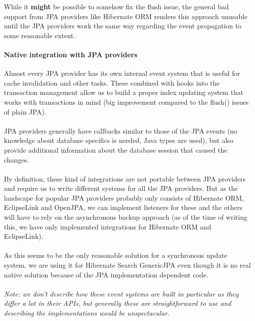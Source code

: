 \noindent
While it \textbf{might} be possible to somehow fix the flush issue, the general bad support from JPA providers like Hibernate ORM renders this approach unusable until the JPA providers work the same way regarding the event propagation to some reasonable extent.

\pagebreak

\paragraph{Native integration with JPA providers}

Almost every JPA provider has its own internal event system that is useful for cache invalidation and other tasks. These combined with hooks into the transaction management allow us to build a proper index updating system that works with transactions in mind (big improvement compared to the flush() issues of plain JPA).
\\\\
JPA providers generally have callbacks similar to those of the JPA events (no knowledge about database specifics is needed, Java types are used), but also provide additional information about the database session that caused the changes.
\\\\
By definition, these kind of integrations are not portable between JPA providers and require us to write different systems for all the JPA providers. But as the landscape for popular JPA providers probably only consists of Hibernate ORM, EclipseLink and OpenJPA, we can implement listeners for these and the others will have to rely on the asynchronous backup approach (as of the time of writing this, we have only implemented integrations for Hibernate ORM and EclipseLink).
\\\\
As this seems to be the only reasonable solution for a synchronous update system, we are using it for Hibernate Search GenericJPA even though it is no real native solution because of the JPA implementation dependent code.
\\\\
\textit{Note: we don't describe how these event systems are built in particular as they differ a lot in their APIs, but generally these are straightforward to use and describing the implementations would be unspectacular.}

\pagebreak

